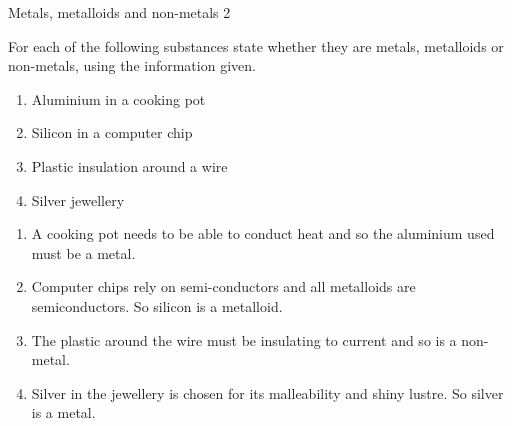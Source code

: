   \par
      \begin{wex}{Metals, metalloids and non-metals 2}{\label{m38708*eip-757}
  \label{m38708*eip-25442}For each of the following substances state whether they are metals, metalloids or non-metals, using the information given.
\label{m38708*eip-id1170742635239}
\begin{enumerate}[noitemsep, label=\textbf{\alph*}. ] 
            \leftskip=20pt\rightskip=\leftskip
\item Aluminium in a cooking pot
\item Silicon in a computer chip
\item Plastic insulation around a wire
\item Silver jewellery\end{enumerate}
  \par }
{\vspace{5pt}
{} \begin{enumerate}
\item A cooking pot needs to be able to conduct heat and so the aluminium used must be a metal.
\item Computer chips rely on semi-conductors and all metalloids are semiconductors. So silicon is a metalloid.
\item The plastic around the wire must be insulating to current and so is a non-metal.
\item Silver in the jewellery is chosen for its malleability and shiny lustre. So silver is a metal.
\end{enumerate}}
    \end{wex}
    \noindent
  \label{m38708**end}
